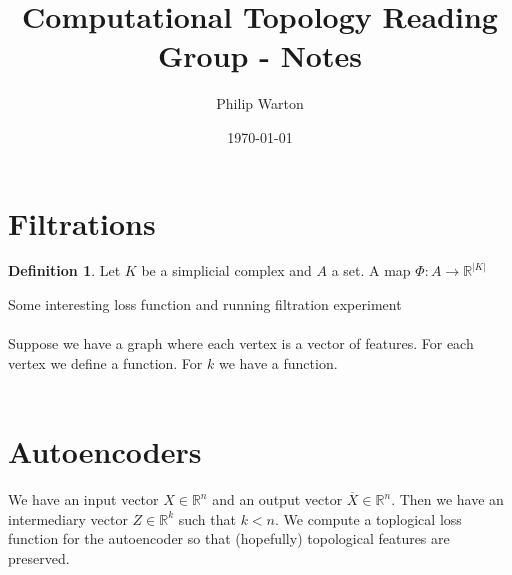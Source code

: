 \documentclass{article}
\theoremstyle{definition}
\newtheorem{definition}{Definition}[section]
\begin{document}
\title{Computational Topology Reading Group - Notes}
\author{Philip Warton}
\date{\today}
\maketitle
\section*{Filtrations}
\begin{definition}
    Let $K$ be a simplicial complex and $A$ a set. A map $\Phi : A \rightarrow \mathbb{R}^{|K|}$
\end{definition}
Some interesting loss function and running filtration experiment
\\\\
Suppose we have a graph where each vertex is a vector of features.
For each vertex we define a function.
For $k$ we have a function.
\\\\
\section{Autoencoders}
We have an input vector $X \in \mathbb{R}^n$ and an output vector $\overline{X} \in \mathbb{R}^n$.
Then we have an intermediary vector $Z \in \mathbb{R}^k$ such that $k < n$. We compute a toplogical loss function for 
the autoencoder so that (hopefully) topological features are preserved.
\end{document}
